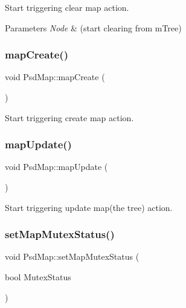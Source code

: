 Start triggering clear map action. 


\begin{DoxyParams}{Parameters}
{\em Node} & (start clearing from m\+Tree) \\
\hline
\end{DoxyParams}
\mbox{\label{class_psd_map_a0b9829cd0b350a6de1150aaaabd567d4}} 
\subsubsection{\texorpdfstring{map\+Create()}{mapCreate()}}
{\footnotesize\ttfamily void Psd\+Map\+::map\+Create (\begin{DoxyParamCaption}{ }\end{DoxyParamCaption})}



Start triggering create map action. 

\mbox{\label{class_psd_map_a325207cab7b23d6880a1690b24700b0b}} 
\subsubsection{\texorpdfstring{map\+Update()}{mapUpdate()}}
{\footnotesize\ttfamily void Psd\+Map\+::map\+Update (\begin{DoxyParamCaption}{ }\end{DoxyParamCaption})}



Start triggering update map(the tree) action. 

\mbox{\label{class_psd_map_ac9eeeec55caef16f27da6bd14da5f3a4}} 
\subsubsection{\texorpdfstring{set\+Map\+Mutex\+Status()}{setMapMutexStatus()}}
{\footnotesize\ttfamily void Psd\+Map\+::set\+Map\+Mutex\+Status (\begin{DoxyParamCaption}\item[{bool}]{Mutex\+Status }\end{DoxyParamCaption})}




